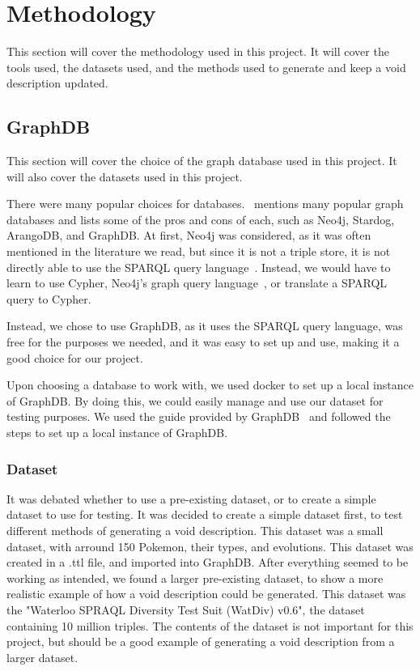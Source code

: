 \section{Methodology}\label{sec:methodology}

This section will cover the methodology used in this project. It will cover the tools used, the datasets used, and the methods used to generate and keep a \gls{void} description updated.

\subsection{GraphDB}\label{sec:graphdb}
This section will cover the choice of the graph database used in this project. It will also cover the datasets used in this project.

There were many popular choices for databases.~\cite{best-graph-databases} mentions many popular graph databases and lists some of the pros and cons of each, such as Neo4j, Stardog, ArangoDB, and GraphDB. At first, Neo4j was considered, as it was often mentioned in the literature we read, but since it is not a triple store, it is not directly able to use the SPARQL query language~\cite{neo4j:-a-reasonable-RDF-graph-database}. Instead, we would have to learn to use Cypher, Neo4j's graph query language~\cite{cypher-query-language}, or translate a SPARQL query to Cypher.

Instead, we chose to use GraphDB, as it uses the SPARQL query language, was free for the purposes we needed, and it was easy to set up and use, making it a good choice for our project.

Upon choosing a database to work with, we used docker to set up a local instance of GraphDB. By doing this, we could easily manage and use our dataset for testing purposes. We used the guide provided by GraphDB~\cite{docker-graphDB} and followed the steps to set up a local instance of GraphDB.

\subsubsection{Dataset}\label{sec:dataset}
It was debated whether to use a pre-existing dataset, or to create a simple dataset to use for testing. It was decided to create a simple dataset first, to test different methods of generating a \gls{void} description. This dataset was a small dataset, with arround 150 Pokemon, their types, and evolutions. This dataset was created in a .ttl file, and imported into GraphDB.
After everything seemed to be working as intended, we found a larger pre-existing dataset, to show a more realistic example of how a \gls{void} description could be generated. This dataset was the "Waterloo SPRAQL Diversity Test Suit (WatDiv) v0.6", the dataset containing 10 million triples. The contents of the dataset is not important for this project, but should be a good example of generating a void description from a larger dataset.

